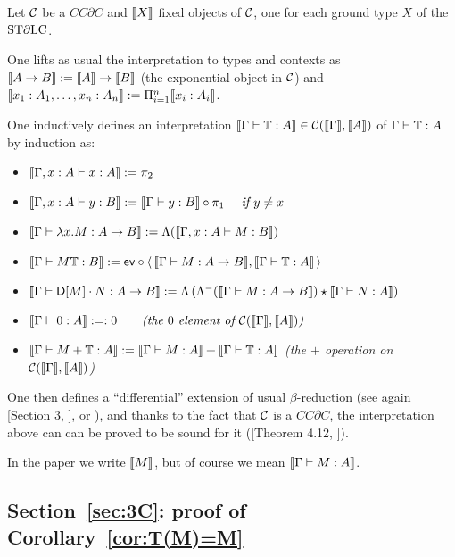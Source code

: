 \begin{definition}
Let $\mathcal{C}$ be a $CC\partial C$ and $\llbracket X\rrbracket$ fixed objects of $\mathcal{C}$, one for each ground type $X$ of the $\mathrm{ST}\partial\mathrm{LC}$.

One lifts as usual the interpretation to types and contexts as $\llbracket A\to B\rrbracket:=\llbracket A\rrbracket\to \llbracket B\rrbracket$ (the exponential object in $\mathcal{C}$) and $\llbracket x_1:A_1,\dots,x_n:A_n\rrbracket:=\Pi_{i=1}^n\llbracket x_i:A_i\rrbracket$.

One inductively defines an interpretation $\llbracket\Gamma \vdash \mathbb{T}:A\rrbracket\in\mathcal{C}(\llbracket\Gamma\rrbracket,\llbracket A\rrbracket)$ of $\Gamma \vdash \mathbb{T}:A$ by induction as:
\begin{itemize}
 \item $\llbracket\Gamma, x:A \vdash x:A\rrbracket:=\pi_2$
 \item $\llbracket\Gamma, x:A \vdash y:B\rrbracket:=\llbracket\Gamma \vdash y:B\rrbracket\circ \pi_1\quad\textit{ if } y\neq x$
 \item $\llbracket\Gamma\vdash \lambda x.M:A\to B\rrbracket:=\Lambda(\llbracket\Gamma,x:A\vdash M:B\rrbracket)$
 \item $\llbracket\Gamma \vdash M\mathbb{T}:B\rrbracket:=\mathsf{ev} \circ \langle \, \llbracket\Gamma \vdash M:A\to B\rrbracket, \llbracket\Gamma \vdash \mathbb{T}:A\rrbracket \, \rangle$
 \item $\llbracket\Gamma \vdash \mathsf{D} [M] \cdot N:A\to B\rrbracket:=\Lambda\left(\Lambda^-(\llbracket\Gamma \vdash M:A\to B\rrbracket)\star \llbracket\Gamma \vdash N:A\rrbracket\right)$
 \item $\llbracket\Gamma \vdash 0:A\rrbracket:=:0 \qquad \textit{(the $0$ element of $\mathcal{C}(\llbracket\Gamma\rrbracket,\llbracket A\rrbracket)$)}$
 \item $\llbracket\Gamma \vdash M+\mathbb{T}:A\rrbracket:=\llbracket\Gamma \vdash M:A\rrbracket+\llbracket\Gamma \vdash \mathbb{T}:A\rrbracket$ \qquad \textit{(the $+$ operation on $\mathcal{C}(\llbracket\Gamma\rrbracket,\llbracket A\rrbracket)$)}
\end{itemize}
\end{definition}

One then defines a ``differential'' extension of usual $\beta$-reduction (see again [Section 3, \cite{Manzo2010}], or \cite{difflambda}), and thanks to the fact that $\mathcal{C}$ is a $CC\partial C$, the interpretation above can can be proved to be sound for it ([Theorem 4.12, \cite{Manzo2010}]).

In the paper we write $\llbracket M\rrbracket$, but of course we mean $\llbracket\Gamma \vdash M:A\rrbracket$.




\subsection{Section~\ref{sec:3C}: proof of Corollary~\ref{cor:T(M)=M}}


